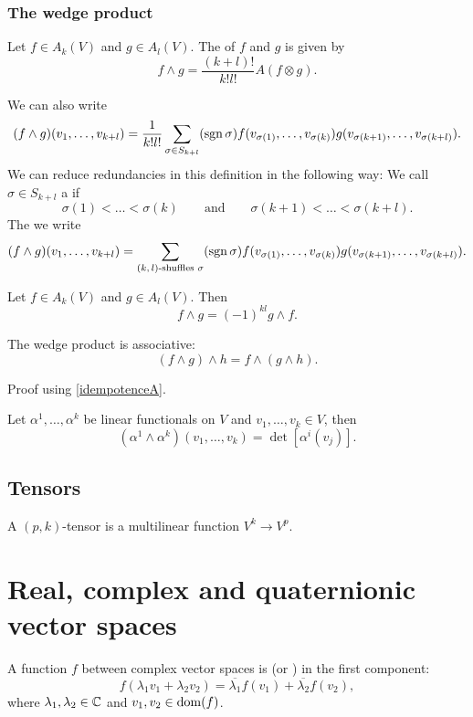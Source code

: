 \subsubsection{The wedge product}
\begin{definition}
Let $f\in A_k(V)$ and $g\in A_l(V)$. The  of $f$ and $g$ is given by
\[ f\wedge g = \frac{(k+l)!}{k!l!}A(f\otimes g). \]
\end{definition}
We can also write
\[ (f\wedge g)(v_1,\ldots,v_{k+l}) = \frac{1}{k!l!}\sum_{\sigma\in S_{k+l}}(\operatorname{sgn} \sigma)f(v_{\sigma(1)},\ldots,v_{\sigma(k)})g(v_{\sigma(k+1)},\ldots, v_{\sigma(k+l)}). \]
We can reduce redundancies in this definition in the following way:
We call $\sigma\in S_{k+l}$ a  if
\[ \sigma(1)<\ldots<\sigma(k) \qquad \text{and}\qquad \sigma(k+1)<\ldots<\sigma(k+l). \]
The we write
\[ (f\wedge g)(v_1,\ldots,v_{k+l}) = \sum_{\text{$(k,l)$-shuffles $\sigma$}}(\operatorname{sgn} \sigma)f(v_{\sigma(1)},\ldots,v_{\sigma(k)})g(v_{\sigma(k+1)},\ldots, v_{\sigma(k+l)}). \]
\begin{proposition}
Let $f\in A_k(V)$ and $g\in A_l(V)$. Then
\[ f\wedge g = (-1)^{kl}g\wedge f. \]
\end{proposition}
\begin{lemma}
The wedge product is associative:
\[ (f\wedge g)\wedge h = f\wedge (g\wedge h). \]
\end{lemma}
Proof using \ref{idempotenceA}.

\begin{lemma}
Let $\alpha^1,\ldots, \alpha^k$ be linear functionals on $V$ and $v_1,\ldots,v_k\in V$, then
\[ (\alpha^1\wedge\alpha^k)(v_1,\ldots, v_k) = \det[\alpha^i(v_j)]. \]
\end{lemma}

\subsection{Tensors}
A $(p,k)$-tensor is a multilinear function $V^k\to V^p$.

\section{Real, complex and quaternionic vector spaces}
\begin{definition}
A function $f$ between complex vector spaces is  (or ) in the first component:
\[f(\lambda_1 v_1 + \lambda_2 v_2) = \overline{\lambda_1}f(v_1) + \overline{\lambda_2}f(v_2),\]
where $\lambda_1,\lambda_2 \in \mathbb{C}$ and $v_1,v_2\in \operatorname{dom}(f)$.
\end{definition}
